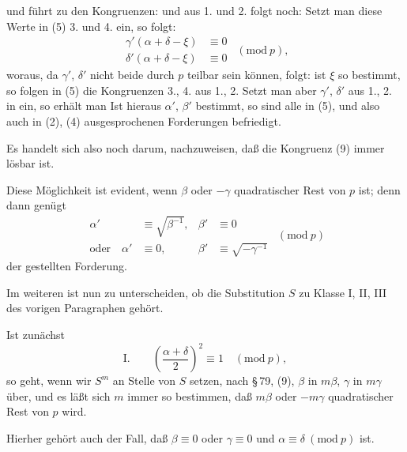 und führt zu den Kongruenzen:
und aus 1. und 2. folgt noch:
Setzt man diese Werte in (5) 3. und 4. ein, so folgt:
\[
\begin{aligned}
\gamma'(\alpha+\delta-\xi) &\equiv 0\\
\delta'(\alpha+\delta-\xi) &\equiv 0
\end{aligned}\ \ (\mathrm{mod}\ p),
\]
woraus, da $\gamma'$, $\delta'$ nicht beide durch $p$ teilbar sein können, folgt:
ist $\xi$ so bestimmt, so folgen in (5) die Kongruenzen 3., 4. aus
1., 2. Setzt man aber $\gamma'$, $\delta'$ aus 1., 2. in
ein, so erhält man
Ist hieraus $\alpha'$, $\beta'$ bestimmt, so sind alle in (5), und also
auch in (2), (4) ausgesprochenen Forderungen befriedigt.

Es handelt sich also noch darum, nachzuweisen, daß die
Kongruenz (9) immer lösbar ist.

Diese Möglichkeit ist evident, wenn $\beta$ oder $-\gamma$ quadratischer
Rest von $p$ ist; denn dann genügt
\[
\begin{aligned}
\alpha' &\equiv \sqrt{\beta^{-1}}, & \beta' &\equiv 0\\
\text{oder}\quad \alpha' &\equiv 0, & \beta' &\equiv \sqrt{-\gamma^{-1}}
\end{aligned}\ \ (\mathrm{mod}\ p)
\]
der gestellten Forderung.

Im weiteren ist nun zu unterscheiden, ob die Substitution $S$
zu Klasse I, II, III des vorigen Paragraphen gehört.

Ist zunächst
\[
\text{I.} \qquad \left(\frac{\alpha+\delta}{2}\right)^2 \equiv 1 \quad (\mathrm{mod}\ p),
\]
so geht, wenn wir $S^m$ an Stelle von $S$ setzen, nach \S\,79, (9),
$\beta$ in $m\beta$, $\gamma$ in $m\gamma$ über, und es läßt sich $m$ immer so bestimmen,
daß $m\beta$ oder $-m\gamma$ quadratischer Rest von $p$ wird.

Hierher gehört auch der Fall, daß $\beta \equiv 0$ oder $\gamma \equiv 0$ und
$\alpha \equiv \delta \ (\mathrm{mod}\ p)$ ist.
